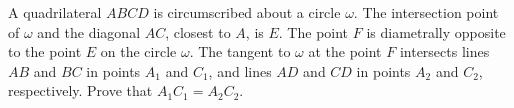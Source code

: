 A quadrilateral $ABCD$ is circumscribed about a circle $\omega$. The intersection point of $\omega$ and the diagonal $AC$,  closest to $A$,  is $E$. The point $F$ is diametrally opposite to the point $E$ on the circle $\omega$. The tangent to $\omega$ at the point $F$ intersects lines $AB$ and $BC$ in points $A_1$ and $C_1$,  and lines $AD$ and $CD$ in points $A_2$ and $C_2$,  respectively. Prove that $A_1C_1=A_2C_2$.